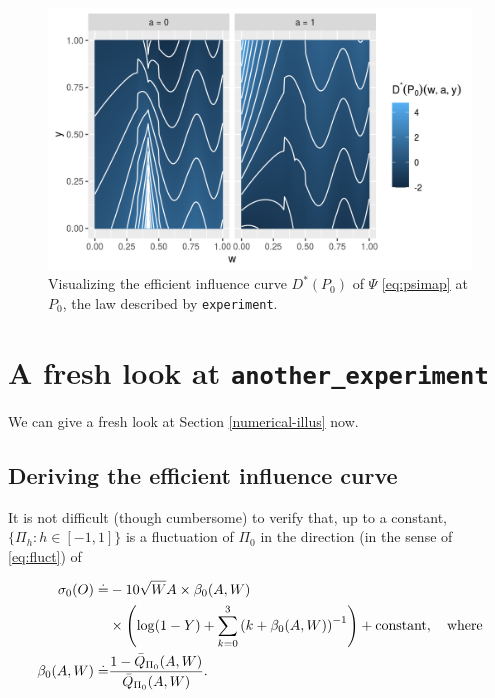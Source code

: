 \documentclass[11pt,openright,twoside]{book}
\newcommand{\defq}{\doteq}
\newcommand{\Qbar}{\bar{Q}}
\theoremstyle{definition}
\theoremstyle{definition}
\theoremstyle{definition}
\theoremstyle{remark}
\begin{document}
\begin{figure}

{\centering \includegraphics[width=0.8\linewidth]{img/eic-three-1} 

}

\caption{Visualizing the efficient influence curve \(D^{*}(P_{0})\) of \(\Psi\) \eqref{eq:psimap} at \(P_{0}\), the law described by \texttt{experiment}.}\label{fig:eic-three}
\end{figure}

\hypertarget{revisiting}{%
\section{\texorpdfstring{A fresh look at \texttt{another\_experiment}}{A fresh look at another\_experiment}}\label{revisiting}}

We can give a fresh look at Section \ref{numerical-illus} now.

\hypertarget{deriving-the-efficient-influence-curve}{%
\subsection{Deriving the efficient influence curve}\label{deriving-the-efficient-influence-curve}}

It is not difficult (though cumbersome) to verify that, up to a constant,
\(\{\Pi_{h} : h \in [-1,1]\}\) is a fluctuation of \(\Pi_{0}\) in the direction
(in the sense of \eqref{eq:fluct}) of

\begin{align}
\notag\sigma_{0}(O)  \defq &- 10 \sqrt{W} A \times \beta_{0}  (A,W)\\
&\times\left(\log(1    -     Y)    +     \sum_{k=0}^{3}    \left(k     +    \beta_{0}
(A,W)\right)^{-1}\right) + \text{constant}, \quad \text{where}\\
\beta_{0}(A,W)\defq & \frac{1
-\Qbar_{\Pi_{0}}(A,W)}{\Qbar_{\Pi_{0}}(A,W)}. \label{eq:sigma0}\end{align}
\end{document}
